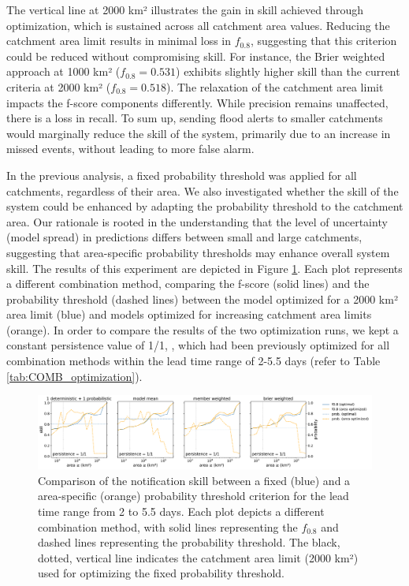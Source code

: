 \documentclass[preprint,12pt,authoryear]{elsarticle}
\begin{document}
The vertical line at 2000 km² illustrates the gain in skill achieved through optimization, which is sustained across all catchment area values. Reducing the catchment area limit results in minimal loss in $f_{0.8}$, suggesting that this criterion could be reduced without compromising skill. For instance, the Brier weighted approach at 1000 km² ($f_{0.8}=0.531$) exhibits slightly higher skill than the current criteria at 2000 km² ($f_{0.8}=0.518$). The relaxation of the catchment area limit impacts the f-score components differently. While precision remains unaffected, there is a loss in recall. To sum up, sending flood alerts to smaller catchments would marginally reduce the skill of the system, primarily due to an increase in missed events, without leading to more false alarm.

In the previous analysis, a fixed probability threshold was applied for all catchments, regardless of their area. We also investigated whether the skill of the system could be enhanced by adapting the probability threshold to the catchment area. Our rationale is rooted in the understanding that the level of uncertainty (model spread) in predictions differs between small and large catchments, suggesting that area-specific probability thresholds may enhance overall system skill. The results of this experiment are depicted in Figure \ref{fig:skill_area_probability}. Each plot represents a different combination method, comparing the f-score (solid lines) and the probability threshold (dashed lines) between the model optimized for a 2000 km² area limit (blue) and models optimized for increasing catchment area limits (orange). In order to compare the results of the two optimization runs, we kept a constant persistence value of 1/1, , which had been previously optimized for all combination methods within the lead time range of 2-5.5 days (refer to Table \ref{tab:COMB_optimization}).

\begin{figure}
    \centering
    \includegraphics[width=1\textwidth]{figures/skill_vs_area_varying_probability_2000km2_1239points_060h.pdf}
    \caption{Comparison of the notification skill between a fixed (blue) and a area-specific (orange) probability threshold criterion for the lead time range from 2 to 5.5 days. Each plot depicts a different combination method, with solid lines representing the $f_{0.8}$ and dashed lines representing the probability threshold. The black, dotted, vertical line indicates the catchment area limit (2000 km²) used for optimizing the fixed probability threshold.}
    \label{fig:skill_area_probability}
\end{figure}
\end{document}
